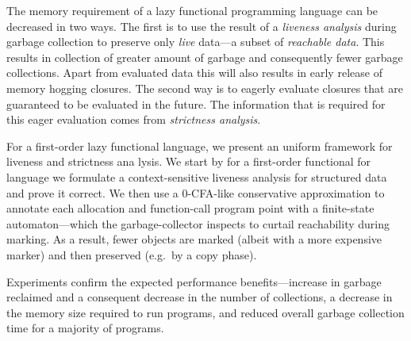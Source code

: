 
The memory  requirement of a lazy functional  programming language can
be decreased  in two ways. The  first is to  use the result of  a {\em
liveness  analysis} during  garbage collection  to preserve  only {\em
live}  data---a  subset  of  {\em  reachable data}.  This  results  in
collection of greater amount of garbage and consequently fewer garbage
collections. Apart from evaluated data this will also results in early
release  of memory  hogging closures.   The second  way is  to eagerly
evaluate closures that  are guaranteed to be evaluated  in the future.
The information that is required  for this eager evaluation comes from
{\em strictness analysis}.

For  a first-order  lazy functional  language, we  present  an uniform
framework  for liveness  and strictness  ana   lysis. We  start by  for a
first-order functional  for language we  formulate a context-sensitive
liveness analysis for  structured data and prove it  correct.  We then
use   a  0-CFA-like  conservative   approximation  to   annotate  each
allocation  and  function-call   program  point  with  a  finite-state
automaton---which   the    garbage-collector   inspects   to   curtail
reachability  during marking. As  a result,  fewer objects  are marked
(albeit with a  more expensive marker) and then  preserved (e.g.\ by a
copy phase).

Experiments  confirm the  expected performance  benefits---increase in
garbage  reclaimed  and  a   consequent  decrease  in  the  number  of
collections, a decrease  in the memory size required  to run programs,
and  reduced  overall  garbage  collection  time  for  a  majority  of
programs.
